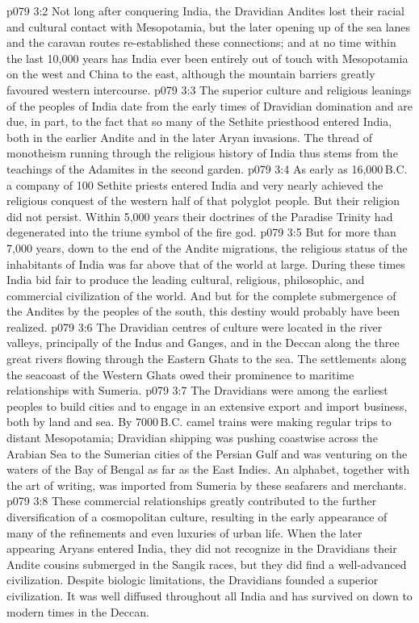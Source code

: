 \vs p079 3:2 Not long after conquering India, the Dravidian Andites lost their racial and cultural contact with Mesopotamia, but the later opening up of the sea lanes and the caravan routes re\hyp{}established these connections; and at no time within the last 10,000 years has India ever been entirely out of touch with Mesopotamia on the west and China to the east, although the mountain barriers greatly favoured western intercourse.
\vs p079 3:3 \pc The superior culture and religious leanings of the peoples of India date from the early times of Dravidian domination and are due, in part, to the fact that so many of the Sethite priesthood entered India, both in the earlier Andite and in the later Aryan invasions. The thread of monotheism running through the religious history of India thus stems from the teachings of the Adamites in the second garden.
\vs p079 3:4 As early as 16,000\,B.C. a company of 100 Sethite priests entered India and very nearly achieved the religious conquest of the western half of that polyglot people. But their religion did not persist. Within 5,000 years their doctrines of the Paradise Trinity had degenerated into the triune symbol of the fire god.
\vs p079 3:5 But for more than 7,000 years, down to the end of the Andite migrations, the religious status of the inhabitants of India was far above that of the world at large. During these times India bid fair to produce the leading cultural, religious, philosophic, and commercial civilization of the world. And but for the complete submergence of the Andites by the peoples of the south, this destiny would probably have been realized.
\vs p079 3:6 \pc The Dravidian centres of culture were located in the river valleys, principally of the Indus and Ganges, and in the Deccan along the three great rivers flowing through the Eastern Ghats to the sea. The settlements along the seacoast of the Western Ghats owed their prominence to maritime relationships with Sumeria.
\vs p079 3:7 The Dravidians were among the earliest peoples to build cities and to engage in an extensive export and import business, both by land and sea. By 7000\,B.C. camel trains were making regular trips to distant Mesopotamia; Dravidian shipping was pushing coastwise across the Arabian Sea to the Sumerian cities of the Persian Gulf and was venturing on the waters of the Bay of Bengal as far as the East Indies. An alphabet, together with the art of writing, was imported from Sumeria by these seafarers and merchants.
\vs p079 3:8 These commercial relationships greatly contributed to the further diversification of a cosmopolitan culture, resulting in the early appearance of many of the refinements and even luxuries of urban life. When the later appearing Aryans entered India, they did not recognize in the Dravidians their Andite cousins submerged in the Sangik races, but they did find a well\hyp{}advanced civilization. Despite biologic limitations, the Dravidians founded a superior civilization. It was well diffused throughout all India and has survived on down to modern times in the Deccan.
